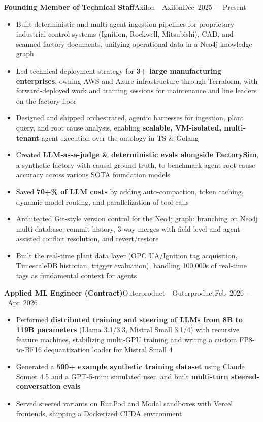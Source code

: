 \documentclass[letterpaper,11pt]{article}
\newcommand{\entry}[3]{%
  \needspace{4\baselineskip}%
  \textbf{#1}\ifx\relax#2\relax\else\ \textbar\ #2\fi\hfill\mbox{#3}\par}
\newenvironment{bullets}
  {\begin{itemize}[leftmargin=1.2em, label=\textbullet, itemsep=1.5pt, parsep=0pt, topsep=2.5pt, partopsep=0pt]}
  {\end{itemize}\vspace{7.7pt}}
\begin{document}
\entry{Founding Member of Technical Staff}{Axilon}{Dec 2025 -- Present}
\begin{bullets}
  \item Built deterministic and multi-agent ingestion pipelines for proprietary industrial control systems (Ignition, Rockwell, Mitsubishi), CAD, and scanned factory documents, unifying operational data in a Neo4j knowledge graph
  \item Led technical deployment strategy for \textbf{3+ large manufacturing enterprises}, owning AWS and Azure infrastructure through Terraform, with forward-deployed work and training sessions for maintenance and line leaders on the factory floor
  \item Designed and shipped orchestrated, agentic harnesses for ingestion, plant query, and root cause analysis, enabling \textbf{scalable, VM-isolated, multi-tenant} agent execution over the ontology in TS \& Golang
  \item Created \textbf{LLM-as-a-judge \& deterministic evals alongside FactorySim}, a synthetic factory with causal ground truth, to benchmark agent root-cause accuracy across various SOTA foundation models
  \item Saved \textbf{70+\% of LLM costs} by adding auto-compaction, token caching, dynamic model routing, and parallelization of tool calls
  \item Architected Git-style version control for the Neo4j graph: branching on Neo4j multi-database, commit history, 3-way merges with field-level and agent-assisted conflict resolution, and revert/restore
  \item Built the real-time plant data layer (OPC UA/Ignition tag acquisition, TimescaleDB historian, trigger evaluation), handling 100,000s of real-time tags as fundamental context for agents
\end{bullets}

\entry{Applied ML Engineer (Contract)}{Outerproduct}{Feb 2026 -- Apr 2026}
\begin{bullets}
  \item Performed \textbf{distributed training and steering of LLMs from 8B to 119B parameters} (Llama 3.1/3.3, Mistral Small 3.1/4) with recursive feature machines, stabilizing multi-GPU training and writing a custom FP8-to-BF16 dequantization loader for Mistral Small 4
  \item Generated a \textbf{500+ example synthetic training dataset} using Claude Sonnet 4.5 and a GPT-5-mini simulated user, and built \textbf{multi-turn steered-conversation evals}
  \item Served steered variants on RunPod and Modal sandboxes with Vercel frontends, shipping a Dockerized CUDA environment
\end{bullets}
\end{document}
